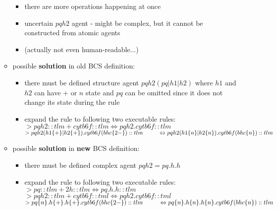 \documentclass[12pt]{article}
\begin{document}
\begin{itemize}
\begin{itemize}
			\begin{itemize}
				\item there are more operations happening at once
				\item uncertain $pqh2$ agent - might be complex, but it cannot be constructed from atomic agents
				\item (actually not even human-readable...)
			\end{itemize}
		\item possible \textbf{solution} in old BCS definition:
			\begin{itemize}
				\item there must be defined structure agent $pqh2(pq|h1|h2)$ where $h1$ and $h2$ can have $+$ or $n$ state and $pq$ can be omitted since it does not change its state during the rule
				\item expand the rule to following two executable rules:\vspace*{0.2cm}\\
				$> pqh2::tlm + cytb6f::tlm \Leftrightarrow pqh2.cytb6f::tlm $\vspace*{0.2cm}\\
				$> pqh2(h1\{+\}|h2\{+\}).cytb6f(bhc\{2-\})::tlm \\ \hspace*{.9cm} \Leftrightarrow pqh2(h1\{n\}|h2\{n\}).cytb6f(bhc\{n\})::tlm$
			\end{itemize}
		\item possible \textbf{solution} in \textbf{new} BCS definition:
			\begin{itemize}
			    \item there must be defined complex agent $pqh2 = pq.h.h$
				\item expand the rule to following two executable rules:\vspace*{0.2cm}\\
				$> pq::tlm + 2 h::tlm \Leftrightarrow pq.h.h::tlm $\vspace*{0.2cm}\\
				$> pqh2::tlm + cytb6f::tml \Leftrightarrow pqh2.cytb6f::tml$\\
				$> pq\{n\}.h\{+\}.h\{+\}.cytb6f(bhc\{2-\})::tlm \\ \hspace*{.9cm} \Leftrightarrow pq\{n\}.h\{n\}.h\{n\}.cytb6f(bhc\{n\})::tlm$
			\end{itemize}
	\end{itemize}
\end{itemize}

\newpage
\end{document}

